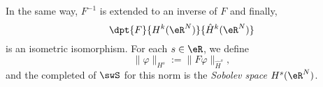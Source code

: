 In the same way, $F^{-1}$ is extended to an inverse of $F$ and finally,
\[ 
  \dpt{ F }{ H^k(\eR^N) }{ \hat H^k(\eR^N) }
\]
is  an isometric isomorphism. For each $s\in\eR$, we define
\begin{equation}
  \| \varphi \|_{H^s}:=\| F\varphi \|_{\hat H^s},
\end{equation}
and the completed of $\swS$ for this norm is the \emph{Sobolev space} $H^s(\eR^N)$.
